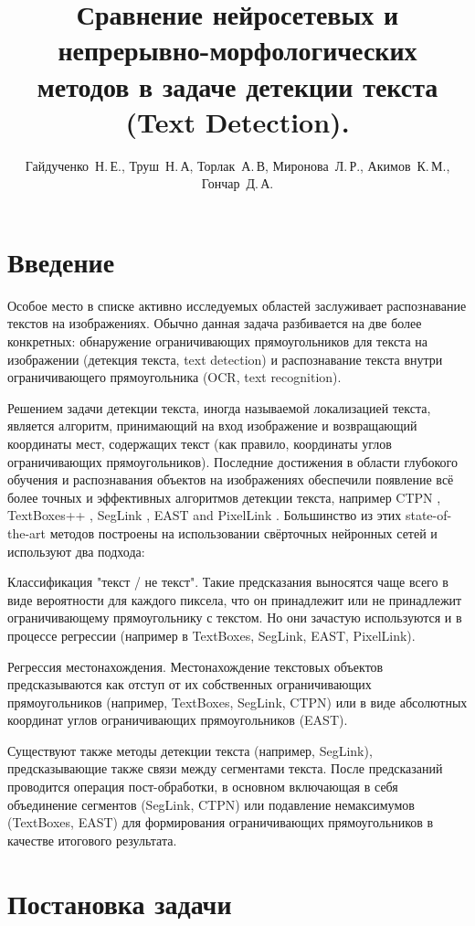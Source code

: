 \documentclass[12pt,twoside]{article}
\title
    [Обнаружение текста]
    {\textbf{Сравнение нейросетевых и непрерывно-морфологических методов в задаче детекции текста (Text Detection).}}
\author
    {Гайдученко~Н.\,Е., Труш~Н.\,А, Торлак~А.\,В, Миронова~Л.\,Р., Акимов~К.\,М., Гончар~Д.\,А.}
\begin{document}
\maketitle
\bigskip

\section{Введение}

Особое место в списке активно исследуемых областей заслуживает распознавание текстов на изображениях. Обычно данная задача разбивается на две более конкретных: обнаружение ограничивающих прямоугольников для текста на изображении (детекция текста, text detection) и распознавание текста внутри ограничивающего прямоугольника (OCR, text recognition). 

Решением задачи детекции текста, иногда называемой локализацией текста, является алгоритм, принимающий на вход изображение и возвращающий координаты мест, содержащих текст (как правило, координаты углов ограничивающих прямоугольников). Последние достижения в области глубокого обучения и распознавания объектов на изображениях обеспечили появление всё более точных и эффективных алгоритмов детекции текста, например CTPN \cite{Tian2016}, TextBoxes++ \cite{Liao2018}, SegLink \cite{Shi2017}, EAST \cite{Zhou2017} and PixelLink \cite{Deng2018}. Большинство из этих state-of-the-art методов построены на использовании свёрточных нейронных сетей и используют два подхода:

Классификация "текст / не текст". Такие предсказания выносятся чаще всего в виде вероятности для каждого пиксела, что он принадлежит или не принадлежит ограничивающему прямоугольнику с текстом. Но они зачастую используются и в процессе регрессии (например в TextBoxes, SegLink, EAST, PixelLink).

Регрессия местонахождения. Местонахождение текстовых объектов предсказываются как отступ от их собственных ограничивающих прямоугольников (например, TextBoxes, SegLink, CTPN) или в виде абсолютных координат углов ограничивающих прямоугольников (EAST).

Существуют также методы детекции текста (например, SegLink), предсказывающие также связи между сегментами текста. После предсказаний проводится операция пост-обработки, в основном включающая в себя объединение сегментов (SegLink, CTPN) или подавление немаксимумов (TextBoxes, EAST) для формирования ограничивающих прямоугольников в качестве итогового результата.

\section{Постановка задачи}
\end{document}
